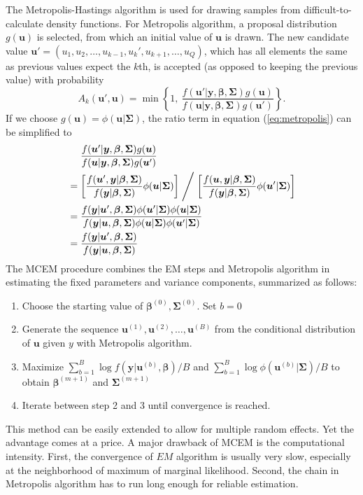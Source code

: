 The Metropolis-Hastings algorithm is used for drawing samples from difficult-to-calculate density 
functions.
For Metropolis algorithm, a proposal distribution $g(\bm u)$ is selected, from which an initial
value of $\bm u$ is drawn. The new candidate value $\bm u' = (u_1, u_2, \ldots,u_{k-1}, u_k',
u_{k+1}, \ldots, u_Q)$, which has all elements the same as previous values expect the $k$th,   is
accepted (as opposed to keeping the previous value) with probability
\begin{equation}\label{eq:metropolis}
	A_k(\bm u', \bm u) = \min \left\{1, ~\frac{f(\bm u'|\bm y, \bm \beta, \bm \Sigma)g(\bm u)}{f(\bm
		u|\bm y, \bm \beta, \bm \Sigma)g(\bm u')}\right\}.
\end{equation}
If we choose $g(\bm u) = \phi (\bm u|\bm\Sigma)$, the ratio term in equation (\ref{eq:metropolis})
can be simplified to 
\begin{equation}\label{eq2.3.4}
	\begin{aligned}
		& ~~~~\frac{f(\bm u'|\bm y, \bm \beta, \bm \Sigma)g(\bm u)}{f(\bm u|\bm y, \bm \beta, \bm
			\Sigma)g(\bm u')} \\
		& = \left[\frac{f(\bm u', \bm y| \bm \beta, \bm \Sigma)}{f(\bm y| \bm \beta, \bm \Sigma)}\phi (\bm
		u|\bm\Sigma)\right]  \Biggm/ \left[
		\frac{f(\bm u, \bm y|\bm \beta, \bm \Sigma)}{f(\bm y|\bm \beta, \bm \Sigma)}\phi (\bm
		u'|\bm\Sigma)\right]\\
		& = \frac{f(\bm y|\bm u', \bm \beta, \bm \Sigma)\phi (\bm u'|\bm\Sigma)\phi (\bm
			u|\bm\Sigma)}{f(\bm y|\bm u, \bm \beta, \bm \Sigma)\phi (\bm u|\bm\Sigma)\phi (\bm u'|\bm\Sigma)}\\
		& = \frac{f(\bm y|\bm u', \bm \beta, \bm \Sigma)}{f(\bm y|\bm u, \bm \beta, \bm \Sigma)}
	\end{aligned}
\end{equation}
The MCEM procedure combines the EM steps and Metropolis algorithm in estimating the fixed
parameters and variance components, summarized as follows:
\begin{enumerate}
	\item Choose the starting value of $\bm \beta^{(0)}, \bm \Sigma^{(0)}$. Set $b= 0$
	\item Generate the sequence $\bm u^{(1)}, \bm u^{(2)}, \ldots, \bm u^{(B)}$ from the conditional
	distribution of $\bm u$ given $y$ with Metropolis algorithm.
	\item Maximize $\sum_{b=1}^B \log f(\bm y|\bm u^{(b)}, \bm\beta)/B$ and $\sum_{b=1}^B\log\phi(\bm
	u^{(b)}|\bm \Sigma)/B$ to obtain $\bm \beta^{(m+1)}$ and $\bm\Sigma^{(m+1)}$
	\item Iterate between step 2 and 3 until convergence is reached.
\end{enumerate}
This method can be easily extended to allow for multiple random effects. Yet the advantage comes
at a price. A major drawback of MCEM is the computational intensity.  First, the convergence of $EM$
algorithm is usually very slow, especially at the neighborhood of maximum of marginal likelihood.
Second, the chain in Metropolis algorithm has to run long enough for reliable estimation. 

